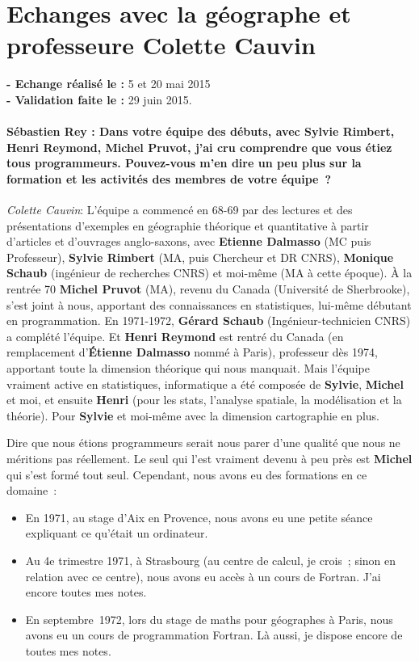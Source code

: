 \section{Echanges avec la géographe et professeure Colette Cauvin}
\label{sec:entretient_cauvin}

\noindent\textbf{- Echange réalisé le : } 5 et 20 mai 2015 \\
\noindent\textbf{- Validation faite le :} 29 juin 2015.

\paragraph*{Sébastien Rey : Dans votre équipe des débuts, avec Sylvie Rimbert, Henri Reymond, Michel Pruvot, j'ai cru comprendre que vous étiez tous programmeurs. Pouvez-vous m'en dire un peu plus sur la formation et les activités des membres de votre équipe ?}

\noindent\emph{Colette Cauvin}: L’équipe a commencé en 68-69 par des lectures et des présentations d’exemples en géographie théorique et quantitative à partir d’articles et d’ouvrages anglo-saxons, avec \textbf{Etienne Dalmasso} (MC puis Professeur), \textbf{Sylvie Rimbert} (MA, puis Chercheur et DR CNRS), \textbf{Monique Schaub} (ingénieur de recherches CNRS) et moi-même (MA à cette époque). À la rentrée 70 \textbf{Michel Pruvot} (MA), revenu du Canada (Université de Sherbrooke), s’est joint à nous, apportant des connaissances en statistiques, lui-même débutant en programmation. En 1971-1972, \textbf{Gérard Schaub} (Ingénieur-technicien CNRS) a complété l’équipe. Et \textbf{Henri Reymond} est rentré du Canada (en remplacement d’\textbf{Étienne Dalmasso} nommé à Paris), professeur dès 1974, apportant toute la dimension théorique qui nous manquait. Mais l’équipe vraiment active en statistiques, informatique a été composée de \textbf{Sylvie}, \textbf{Michel} et moi, et ensuite \textbf{Henri} (pour les stats, l’analyse spatiale, la modélisation et la théorie). Pour \textbf{Sylvie} et moi-même avec la dimension cartographie en plus. 

Dire que nous étions programmeurs serait nous parer d’une qualité que nous ne méritions pas réellement. Le seul qui l’est vraiment devenu à peu près est \textbf{Michel} qui s’est formé tout seul. Cependant, nous avons eu des formations en ce domaine :
\begin{itemize}
 \item En 1971, au stage d’Aix en Provence, nous avons eu une petite séance expliquant ce qu’était un ordinateur.
 \item Au 4e trimestre 1971, à Strasbourg (au centre de calcul, je crois ; sinon en relation avec ce centre), nous avons eu accès à un cours de Fortran. J’ai encore toutes mes notes.
 \item En septembre 1972, lors du stage de maths pour géographes à Paris, nous avons eu un cours de programmation Fortran. Là aussi, je dispose encore de toutes mes notes.
\end{itemize}

